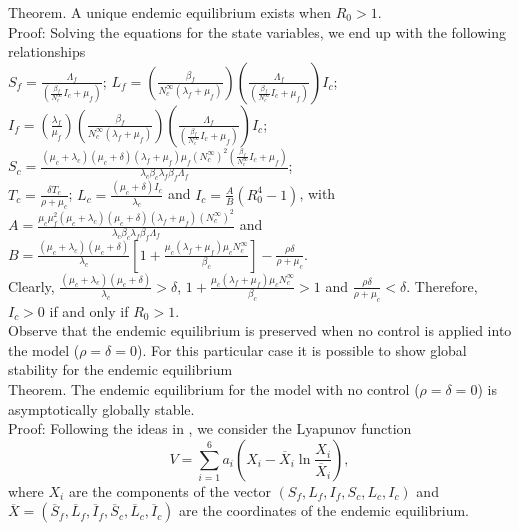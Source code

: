\documentclass[preprint,12pt]{elsarticle}
\begin{document}
\noindent Theorem. A unique endemic equilibrium exists when $R_0>1$.\\
Proof: Solving the equations for the state variables, we end up with the following relationships\\
$S_f=\frac{\Lambda_f}{\left(\frac{\beta_f}{N_c^{\infty}}I_c+\mu_f\right)}$;
$L_f=\left(\frac{\beta_f}{N_c^{\infty}(\lambda_f+\mu_f)}\right)\left(\frac{\Lambda_f}{\left(\frac{\beta_f}{N_c^{\infty}}I_c+\mu_f\right)}\right)I_c$;\\
$I_f=\left(\frac{\lambda_f}{\mu_f}\right)\left(\frac{\beta_f}{N_c^{\infty}(\lambda_f+\mu_f)}\right)\left(\frac{\Lambda_f}{\left(\frac{\beta_f}{N_c^{\infty}}I_c+\mu_f\right)}\right)I_c$;
$S_c=\frac{(\mu_c+\lambda_c)(\mu_c+\delta)(\lambda_f+\mu_f)
    \mu_f
    (N_c^{\infty})^2\left(\frac{\beta_f}{N_c^{\infty}}I_c+\mu_f\right)}{\lambda_c\beta_c\lambda_f\beta_f\Lambda_f}$;\\
$T_c=\frac{\delta T_c}{\rho+\mu_c}$;
$L_c=\frac{(\mu_c+\delta)I_c}{\lambda_c}$ and
$I_c=\frac{A}{B}\left(R_0^4-1\right)$,
with\\
$A=\frac{\mu_c\mu_f^2(\mu_c+\lambda_c)(\mu_c+\delta)(\lambda_f+\mu_f)
    (N_c^{\infty})^2}{\lambda_c\beta_c\lambda_f\beta_f\Lambda_f}$ and
    $B=\frac{(\mu_c+\lambda_c)(\mu_c+\delta)}{\lambda_c}\left[1+{\frac{\mu_c(\lambda_f+\mu_f)\mu_cN_c^{\infty}}{\beta_c}}\right]-\frac{\rho\delta}{\rho+\mu_c}$.\\
Clearly, $\frac{(\mu_c+\lambda_c)(\mu_c+\delta)}{\lambda_c}>\delta$, $1+{\frac{\mu_c(\lambda_f+\mu_f)\mu_c N_c^{\infty}}{\beta_c}}>1$ and $\frac{\rho\delta}{\rho+\mu_c}<\delta$. Therefore, $I_c>0$ if and only if $R_0>1$.\\

\noindent Observe that the endemic equilibrium is preserved when no control is applied into the model ($\rho=\delta=0$). For this particular case it is possible to show global stability for the endemic equilibrium\\

\noindent Theorem. The endemic equilibrium for the model with no control ($\rho=\delta=0$) is asymptotically globally stable.\\
Proof: Following the ideas in \cite{Zhou:2014}, we consider the Lyapunov function
$$V=\sum_{i=1}^6a_i\left(X_i-\overline{X}_i\ln{\frac{X_i}{\overline{X}_i}}\right),$$ where $X_i$ are the components of the vector $(S_f,L_f,I_f,S_c,L_c,I_c)$ and $\overline{X}=(\overline{S}_f,\overline{L}_f,\overline{I}_f,\overline{S}_c,\overline{L}_c,\overline{I}_c)$ are the coordinates of the endemic equilibrium.
\end{document}
